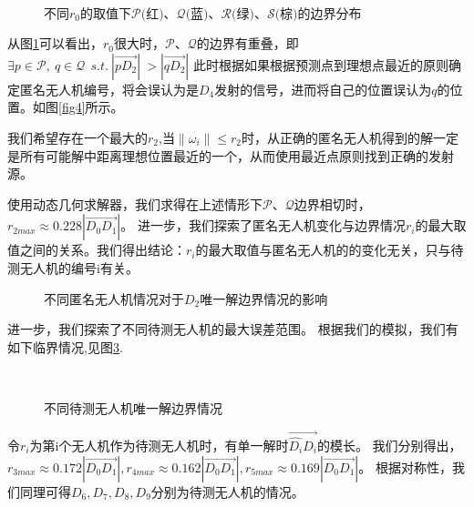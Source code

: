 \documentclass[withoutpreface,bwprint]{cumcmthesis} %
\begin{document}
			\begin{figure}[H]
				\centering
				\\
				\caption{不同$r_0$的取值下$\mathcal{P}\text{(红)}\text{、}\mathcal{Q}\text{(蓝)}\text{、}\mathcal{R}\text{(绿)}\text{、}\mathcal{S}\text{(棕)}$的边界分布}
				\label{fig7}
			\end{figure}
			从图\ref{fig7}可以看出，$r_0$很大时，$\mathcal{P}\text{、}\mathcal{Q}$的边界有重叠，即$
			\exists p\in \mathcal{P},\ q\in \mathcal{Q}\ \ s.t.\ \left| \overrightarrow{pD_2} \right|\ >\left| \overrightarrow{qD_2} \right|$ 此时根据如果根据预测点到理想点最近的原则确定匿名无人机编号，将会误认为是$D_4$发射的信号，进而将自己的位置误认为$q$的位置。如图\ref{fig4}所示。
			
			我们希望存在一个最大的$r_2$,当$\lVert\omega_i\rVert \leqslant r_2$时，从正确的匿名无人机得到的解一定是所有可能解中距离理想位置最近的一个，从而使用最近点原则找到正确的发射源。
			
			使用动态几何求解器，我们求得在上述情形下$\mathcal{P}\text{、}\mathcal{Q}$边界相切时，$r_{2max}\approx 0.228\left| \overrightarrow{D_0D_1} \right|$。
			进一步，我们探索了匿名无人机变化与边界情况$r_i$的最大取值之间的关系。我们得出结论：$r_i$的最大取值与匿名无人机的的变化无关，只与待测无人机的编号i有关。
			\begin{figure}[H]
				\centering
				\caption{不同匿名无人机情况对于$D_2$唯一解边界情况的影响}
				\label{fig10}
			\end{figure}
		
			进一步，我们探索了不同待测无人机的最大误差范围。
			根据我们的模拟，我们有如下临界情况,见图\ref{fig12}.
			\begin{figure}[htb]
				\centering
				\\
				\caption{不同待测无人机唯一解边界情况}
				\label{fig12}
			\end{figure}
			\par
			令$r_i$为第i个无人机作为待测无人机时，有单一解时$\overrightarrow{\widehat{D_i}D_i}$的模长。
			我们分别得出，$r_{3max}\approx 0.172\left| \overrightarrow{D_0D_1} \right|,r_{4max}\approx 0.162\left| \overrightarrow{D_0D_1} \right|,r_{5max}\approx 0.169\left| \overrightarrow{D_0D_1} \right|$。
			根据对称性，我们同理可得$D_6,D_7,D_8,D_9$分别为待测无人机的情况。
			
\end{document}
